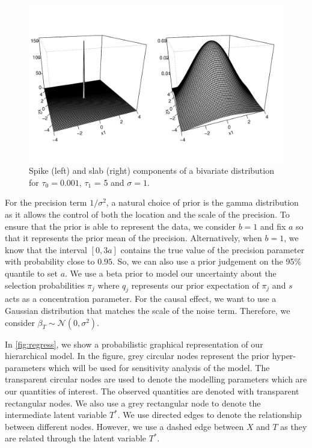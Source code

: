 \documentclass[preprint,12pt]{elsarticle}
\newcommand{\normal}{\mathcal{N}}
\begin{document}
\begin{figure}[h]
	\begin{center}
		\includegraphics[width = 0.95\linewidth]{spike_slab_bi.pdf}
	\end{center}
	\caption{Spike (left) and slab (right) components of a bivariate distribution for $\tau_0 = 0.001$, $\tau_1$ = 5 and $\sigma=1$.}
	\label{fig:ssbl}
\end{figure}

For the precision term $1/\sigma^2$, a natural choice of prior is the gamma distribution
as it allows the control of both the location and the scale of the precision.
To ensure that the prior is able to represent the data, we consider $b=1$ and 
fix $a$ so that it represents the prior mean of the precision.
Alternatively, when $b=1$, we know that the interval
$[0, 3a]$ contains the true value of the precision parameter with probability close to $0.95$.
So, we can also use a prior judgement on the 95\% quantile to set $a$.
We use a beta prior to
model our uncertainty about
the selection probabilities $\pi_j$ where  $q_j$ represents our prior expectation of $\pi_j$ and $s$ acts as 
a concentration parameter.
For the causal effect, we want to use a Gaussian distribution that 
matches the scale of the noise term. Therefore, we consider $\beta_T\sim \normal(0,\sigma^2)$. 

In \cref{fig:regress}, we show a probabilistic graphical representation
of our hierarchical model. In the figure, grey circular nodes represent the
prior hyper-parameters which will be used for sensitivity analysis
of the model. The transparent circular nodes are used to denote
the modelling parameters which are our quantities of interest. 
The observed quantities are denoted with transparent rectangular
nodes. We also use a grey rectangular node to denote the intermediate
latent variable $T^*$. We use directed edges to denote the
relationship between different nodes. However, we use a dashed
edge between $X$ and $T$ as they are related through the latent
variable $T^*$. 
\end{document}
